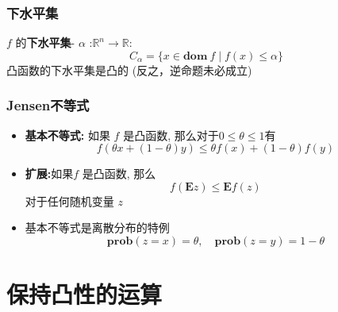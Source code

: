 \documentclass[handout,10pt]{beamer}
\begin{document}
\begin{frame}
	\frametitle{下水平集}
	$f$ 的\textbf{下水平集}- $\alpha$ :$ \mathbb{R}^{n} \rightarrow \mathbb{R}:$
	\begin{equation}
		C_{\alpha}=\{x \in \textbf{dom}\ f \mid f(x) \leq \alpha\}
	\end{equation}
    \textrm{凸函数的下水平集是凸的 (反之，逆命题未必成立)}

\end{frame}
\begin{frame}
	\frametitle{Jensen不等式}

\begin{itemize}[<+->]
  \item \textbf{基本不等式:} 如果 $f$ 是凸函数, 那么对于$0 \leq \theta \leq 1$有
	\begin{equation}
		f(\theta x+(1-\theta) y) \leq \theta f(x)+(1-\theta) f(y)
	\end{equation}

\item
	\textbf{扩展:}如果$f$ 是凸函数, 那么
	\begin{equation}
		f(\mathbf{E} z) \leq \mathbf{E} f(z)
	\end{equation}
    对于任何随机变量 $z$\\

  \item 基本不等式是离散分布的特例
    \begin{equation}
    	\textbf{prob}(z=x)=\theta, \quad \textbf{prob}(z=y)=1-\theta
    \end{equation}
\end{itemize}
	
\end{frame}
\section{保持凸性的运算}
\end{document}
